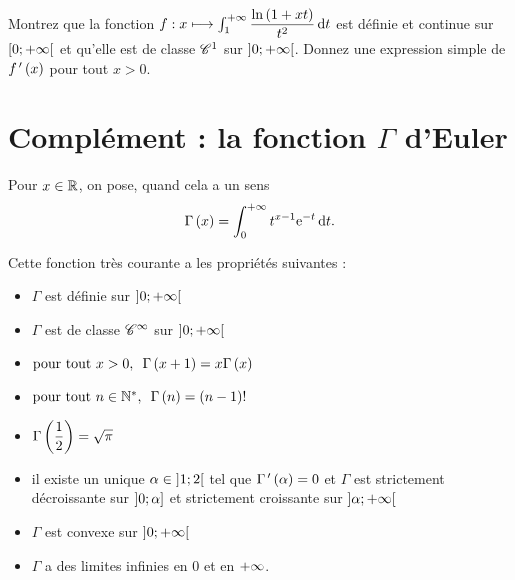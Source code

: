 \begin{exo}
Montrez que la fonction \(f:x\mapsto\int_1^{\pinf}\dfrac{\ln\paren{1+xt}}{t^2}\odif{t}\) est définie et continue sur \(\left[0;+\infty\right[\) et qu'elle est de classe \(\mathscr{C}^{1}\) sur \(\left]0;+\infty\right[\). Donnez une expression simple de \(f^{\,\prime}\left(x\right)\) pour tout \(x>0\).
\end{exo}

\section{Complément : la fonction \(\Gamma\) d'Euler}

Pour \(x\in\mathbb{R}\), on pose, quand cela a un sens \[\Gamma\paren{x}=\int_0^{\pinf}t^{x-1}\e{-t}\odif{t}.\]

Cette fonction très courante a les propriétés suivantes :

\begin{itemize}
    \item \(\Gamma\) est définie sur \(\left]0;+\infty\right[\) \\
    \item \(\Gamma\) est de classe \(\mathscr{C}^{\infty}\) sur \(\left]0;+\infty\right[\) \\
    \item \(\quantifs{\tpt x>0}\Gamma\paren{x+1}=x\Gamma\paren{x}\) \\
    \item \(\quantifs{\tpt n\in\Ns}\Gamma\paren{n}=\paren{n-1}!\) \\
    \item \(\Gamma\left(\dfrac{1}{2}\right)=\sqrt{\pi}\) \\
    \item il existe un unique \(\alpha\in\left]1;2\right[\) tel que \(\Gamma^{\,\prime}\left(\alpha\right)=0\) et \(\Gamma\) est strictement décroissante sur \(\left]0;\alpha\right]\) et strictement croissante sur \(\left]\alpha;+\infty\right[\) \\
    \item \(\Gamma\) est convexe sur \(\left]0;+\infty\right[\) \\
    \item \(\Gamma\) a des limites infinies en \(0\) et en \(+\infty\).
\end{itemize}
